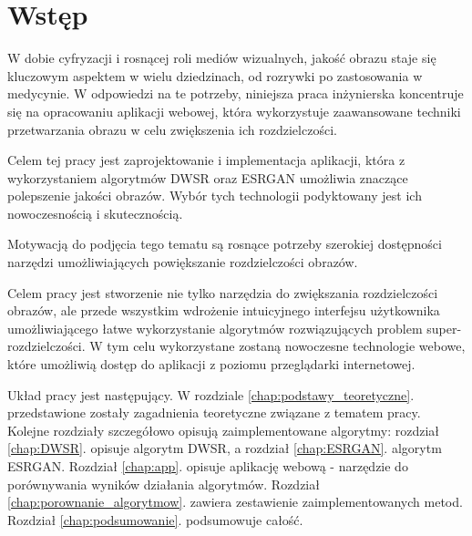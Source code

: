 \chapter{Wstęp}

W dobie cyfryzacji i rosnącej roli mediów wizualnych, jakość obrazu staje się kluczowym aspektem w wielu dziedzinach, od rozrywki po zastosowania w medycynie. W odpowiedzi na te potrzeby, niniejsza praca inżynierska koncentruje się na opracowaniu aplikacji webowej, która wykorzystuje zaawansowane techniki przetwarzania obrazu w celu zwiększenia ich rozdzielczości.

Celem tej pracy jest zaprojektowanie i implementacja aplikacji, która z wykorzystaniem algorytmów DWSR \cite{guo2017deep} oraz ESRGAN \cite{wang2018esrgan} umożliwia znaczące polepszenie jakości obrazów. Wybór tych technologii podyktowany jest ich nowoczesnością i skutecznością.

Motywacją do podjęcia tego tematu są rosnące potrzeby szerokiej dostępności narzędzi umożliwiających powiększanie rozdzielczości obrazów.

Celem pracy jest stworzenie nie tylko narzędzia do zwiększania rozdzielczości obrazów, ale przede wszystkim wdrożenie intuicyjnego interfejsu użytkownika umożliwiającego łatwe wykorzystanie algorytmów rozwiązujących problem super-rozdzielczości. W tym celu wykorzystane zostaną nowoczesne technologie webowe, które umożliwią dostęp do aplikacji z poziomu przeglądarki internetowej.

Układ pracy jest następujący. W rozdziale \ref{chap:podstawy_teoretyczne}. przedstawione zostały zagadnienia teoretyczne związane z tematem pracy. Kolejne rozdziały szczegółowo opisują zaimplementowane algorytmy: rozdział \ref{chap:DWSR}. opisuje algorytm DWSR, a rozdział \ref{chap:ESRGAN}. algorytm ESRGAN. Rozdział \ref{chap:app}. opisuje aplikację webową - narzędzie do porównywania wyników działania algorytmów. Rozdział \ref{chap:porownanie_algorytmow}. zawiera zestawienie zaimplementowanych metod. Rozdział \ref{chap:podsumowanie}. podsumowuje całość.